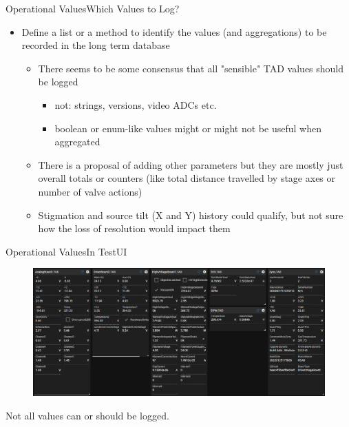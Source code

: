 \documentclass[t, 9pt, aspectratio=169]{beamer}
\begin{document}
    \begin{frame}{Operational Values}{Which Values to Log?}
        \begin{itemize}
            \item Define a list or a method to identify the values (and aggregations) to be recorded in the long term database
            \begin{itemize}
                \item There seems to be some consensus that all "sensible" TAD values should be logged
                \begin{itemize}
                    \item not: strings, versions, video ADCs etc.
                    \item boolean or enum-like values might or might not be useful when aggregated
                \end{itemize}
                \item There is a proposal of adding other parameters but they are mostly just overall totals or counters (like total distance travelled by stage axes or number of valve actions)
                \item Stigmation and source tilt (X and Y) history could qualify, but not sure how the loss of resolution would impact them
            \end{itemize}
        \end{itemize}
    \end{frame}

    \begin{frame}{Operational Values}{In TestUI}
        \vspace*{-1cm}
        \begin{figure}
            \hspace*{-0.8cm}\includegraphics[scale=0.37]{tad-accessors-xl2.jpg}
        \end{figure}
        Not all values can or should be logged.
    \end{frame}
\end{document}
